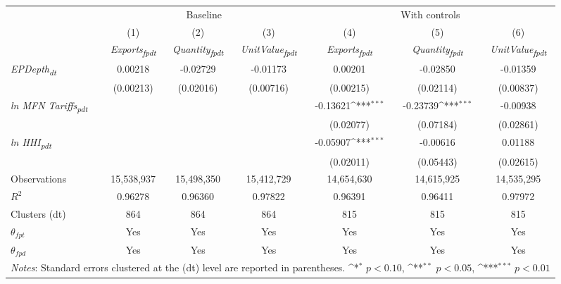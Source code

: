 {
\def\sym#1{\ifmmode^{#1}\else\(^{#1}\)\fi}
\begin{tabular}{l*{6}{c}}
\toprule
&\multicolumn{3}{c}{Baseline}&\multicolumn{3}{c}{With controls}\\\cmidrule(lr){2-4}\cmidrule(lr){5-7}
&(1)&(2)&(3)&(4)&(5)&(6)\\
&\textit{Exports\textsubscript{fpdt}}&\textit{Quantity\textsubscript{fpdt}}&\textit{UnitValue\textsubscript{fpdt}}&\textit{Exports\textsubscript{fpdt}}&\textit{Quantity\textsubscript{fpdt}}&\textit{UnitValue\textsubscript{fpdt}}\\
\midrule
\textit{EPDepth\textsubscript{dt}} & 0.00218 & -0.02729 & -0.01173 & 0.00201 & -0.02850 & -0.01359\\
 & (0.00213) & (0.02016) & (0.00716) & (0.00215) & (0.02114) & (0.00837)\\
\addlinespace
\textit{ln MFN Tariffs\textsubscript{pdt}} &  &  &  & -0.13621\sym{***} & -0.23739\sym{***} & -0.00938\\
 &  &  &  & (0.02077) & (0.07184) & (0.02861)\\
\addlinespace
\textit{ln HHI\textsubscript{pdt}} &  &  &  & -0.05907\sym{***} & -0.00616 & 0.01188\\
 &  &  &  & (0.02011) & (0.05443) & (0.02615)\\
\midrule
Observations & 15,538,937 & 15,498,350 & 15,412,729 & 14,654,630 & 14,615,925 & 14,535,295\\
$R^{2}$ & 0.96278 & 0.96360 & 0.97822 & 0.96391 & 0.96411 & 0.97972\\
Clusters (dt) & 864 & 864 & 864 & 815 & 815 & 815\\
$\theta_{fpt}$ & Yes & Yes & Yes & Yes & Yes & Yes\\
$\theta_{fpd}$ & Yes & Yes & Yes & Yes & Yes & Yes\\
\bottomrule
\multicolumn{7}{l}{\footnotesize \textit{Notes}: Standard errors clustered at the (dt) level are reported in parentheses. \sym{*} \(p<0.10\), \sym{**} \(p<0.05\), \sym{***} \(p<0.01\)}\\
\end{tabular}
}
